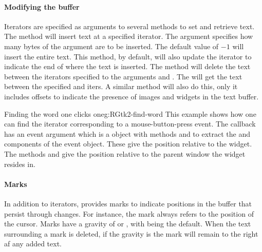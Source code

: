 \paragraph{Modifying the buffer}
Iterators are specified as arguments to several methods to set and
retrieve text. The  method will insert
text at a specified iterator. The argument
 specifies how many bytes of the
 argument are to be inserted. The default value of $-1$
will insert the entire text. This
method, by default, will also update the iterator to indicate the end
of where the text is inserted. The 
method will delete the text between the iterators specified to the
arguments  and
. The
 will get the text between the
specified  and
 iters. A similar method
 will also do this, only it includes
offsets to indicate the presence of images and widgets in the text
buffer.

\begin{example}{Finding the word one clicks on}{eg:RGtk2-find-word}
This example shows how one can find the iterator corresponding to a
mouse-button-press event. The callback has an event argument which is
a  object with methods
 and  to
extract the  and  components of the event
object. These give the position relative to the widget. The methods
 and
 give the position relative to the
parent window the widget resides in.


\begin{Schunk}
\end{Schunk}
\end{example}


\paragraph{Marks}
In addition to iterators, \GTK\/ provides marks to indicate positions
in the buffer that persist through changes. For instance, the mark
 always refers to the position of the cursor. Marks have a
gravity of  or , with  being the
default. When the text surrounding a mark is deleted, if the gravity
is  the mark will remain to the right af any added
text. 


